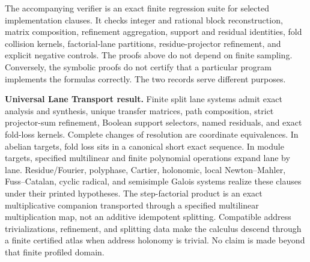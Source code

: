 The accompanying verifier is an exact finite regression suite for selected
implementation clauses.  It checks integer and rational block reconstruction,
matrix composition, refinement aggregation, support and residual identities,
fold collision kernels, factorial-lane partitions, residue-projector
refinement, and explicit negative controls.  The proofs above do not depend on
finite sampling.  Conversely, the symbolic proofs do not certify that a
particular program implements the formulas correctly.  The two records serve
different purposes.


\begin{resultbox}
\textbf{Universal Lane Transport result.}
Finite split lane systems admit exact analysis and synthesis, unique transfer
matrices, path composition, strict projector-sum refinement, Boolean support
selectors, named residuals, and exact fold-loss kernels.  Complete changes of
resolution are coordinate equivalences.  In abelian targets, fold loss sits in
a canonical short exact sequence.  In module targets, specified multilinear
and finite polynomial operations expand lane by lane.  Residue/Fourier,
polyphase, Cartier, holonomic, local Newton--Mahler, Fuss--Catalan, cyclic
radical, and semisimple Galois systems realize these clauses under their
printed hypotheses.  The step-factorial product is an exact multiplicative
companion transported through a specified multilinear multiplication map,
not an additive idempotent splitting.  Compatible address trivializations,
refinement, and splitting data make the calculus descend through a finite
certified atlas when address holonomy is trivial.  No claim is made beyond
that finite profiled domain.
\end{resultbox}
